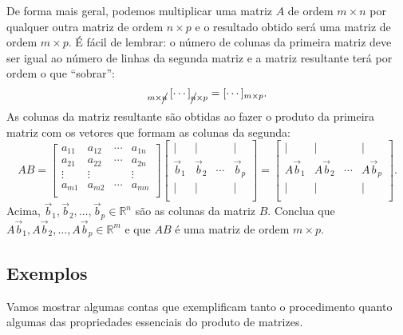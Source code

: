 \documentclass[../livro.tex]{subfiles}  %
\begin{document}
De forma mais geral, podemos multiplicar uma matriz $A$ de ordem $m \times n$ por qualquer outra matriz de ordem $n \times p$ e o resultado obtido será uma matriz de ordem $m \times p$. É fácil de lembrar: o número de colunas da primeira matriz deve ser igual ao número de linhas da segunda matriz e a matriz resultante terá por ordem o que  ``sobrar'':
\begin{equation}
[\cdots]_{m \times \cancel{n}} \, [\cdots]_{\cancel{n} \times p} = [\cdots]_{m \times p}.
\end{equation} As colunas da matriz resultante são obtidas ao fazer o produto da primeira matriz com os vetores que formam as colunas da segunda:
\begin{equation}
A B =
\left[
\begin{array}{cccc}
a_{11} & a_{12} & \cdots & a_{1n} \\
a_{21} & a_{22} & \cdots & a_{2n} \\
\vdots & \vdots &        & \vdots \\
a_{m1} & a_{m2} & \cdots & a_{mn} \\
\end{array}
\right]
\left[
\begin{array}{cccc}
| & |  &   & | \\
\vec{b}_{1} & \vec{b}_{2} & \cdots & \vec{b}_{p} \\
| & |  &   & | \\
\end{array}
\right] =
\left[
\begin{array}{cccc}
| & |  &   & | \\
A\vec{b}_{1} & A\vec{b}_{2} & \cdots & A\vec{b}_{p} \\
| & |  &   & | \\
\end{array}
\right].
\end{equation} Acima, $\vec{b}_{1}, \vec{b}_{2}, \dots, \vec{b}_{p} \in \mathbb{R}^n$ são as colunas da matriz $B$. Conclua que $A\vec{b}_{1}, A\vec{b}_{2}, \dots, A\vec{b}_{p} \in \mathbb{R}^m$ e que $AB$ é uma matriz de ordem $m \times p$.

\subsection{Exemplos}

Vamos mostrar algumas contas que exemplificam tanto o procedimento quanto algumas das propriedades essenciais do produto de matrizes.
\end{document}
